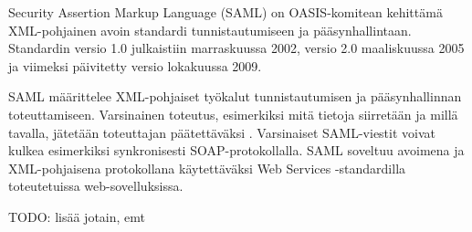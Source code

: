 Security Assertion Markup Language (SAML) on OASIS-komitean kehittämä XML-pohjainen avoin standardi tunnistautumiseen ja pääsynhallintaan. Standardin versio 1.0 julkaistiin marraskuussa 2002, versio 2.0 maaliskuussa 2005 ja viimeksi päivitetty versio lokakuussa 2009.

SAML määrittelee XML-pohjaiset työkalut tunnistautumisen ja pääsynhallinnan toteuttamiseen. Varsinainen toteutus, esimerkiksi mitä tietoja siirretään ja millä tavalla, jätetään toteuttajan päätettäväksi \cite{dynamic_saml}. Varsinaiset SAML-viestit voivat kulkea esimerkiksi synkronisesti SOAP-protokollalla. SAML soveltuu avoimena ja XML-pohjaisena protokollana käytettäväksi Web Services -standardilla toteutetuissa web-sovelluksissa.

TODO: lisää jotain, emt